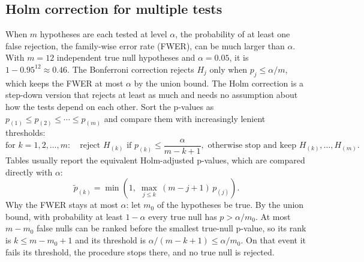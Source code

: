 \subsection*{Holm correction for multiple tests}
When \(m\) hypotheses are each tested at level \(\alpha\), the probability of at least one false rejection, the family-wise error rate (FWER), can be much larger than \(\alpha\).
With \(m = 12\) independent true null hypotheses and \(\alpha = 0.05\), it is \(1 - 0.95^{12} \approx 0.46\).
The Bonferroni correction rejects \(H_j\) only when \(p_j \le \alpha/m\), which keeps the FWER at most \(\alpha\) by the union bound.
The Holm correction is a step-down version that rejects at least as much and needs no assumption about how the tests depend on each other.
Sort the p-values as \(p_{(1)} \le p_{(2)} \le \cdots \le p_{(m)}\) and compare them with increasingly lenient thresholds:
\[
\text{for } k = 1, 2, \ldots, m: \quad \text{reject } H_{(k)} \text{ if } p_{(k)} \le \frac{\alpha}{m-k+1}, \text{ otherwise stop and keep } H_{(k)}, \ldots, H_{(m)}.
\]
Tables usually report the equivalent Holm-adjusted p-values, which are compared directly with \(\alpha\):
\[
\tilde p_{(k)} = \min\left(1,\; \max_{j \le k}\, (m-j+1)\, p_{(j)}\right).
\]
Why the FWER stays at most \(\alpha\): let \(m_0\) of the hypotheses be true.
By the union bound, with probability at least \(1-\alpha\) every true null has \(p > \alpha/m_0\).
At most \(m - m_0\) false nulls can be ranked before the smallest true-null p-value, so its rank is \(k \le m - m_0 + 1\) and its threshold is \(\alpha/(m-k+1) \le \alpha/m_0\).
On that event it fails its threshold, the procedure stops there, and no true null is rejected.

